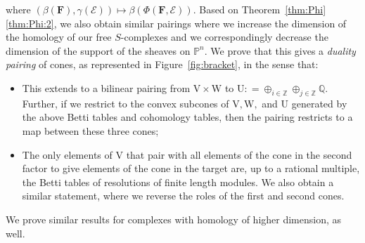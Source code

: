 \documentclass[12pt]{amsart}
\theoremstyle{definition}
\theoremstyle{remark}
\newcommand{\ZZ}{\mathbb{Z}}
\newcommand{\QQ}{\mathbb{Q}}
\newcommand{\UU}{\mathrm{U}}
\newcommand{\VV}{\mathrm{V}}
\newcommand{\WW}{\mathrm{W}}
\newcommand{\cE}{\mathcal{E}}
\newcommand{\FF}{\mathbf{F}}
\begin{document}
where $(\beta(\FF),\gamma(\cE))\mapsto \beta(\Phi(\FF,\cE))$.  Based on Theorem~\ref{thm:Phi}\eqref{thm:Phi:2}, we also obtain similar pairings where we increase the dimension of the homology of our free $S$-complexes and we correspondingly decrease the dimension of the support of the sheaves on $\mathbb P^n$.  We prove that this  gives a  \emph{duality pairing} of cones, as represented in Figure~\ref{fig:bracket},
in the sense that:
\begin{itemize}
\item This extends to a bilinear pairing from $\VV\times \WW$ to $\UU: = \oplus_{i\in \ZZ} \oplus_{j\in \ZZ}\QQ$.  Further, if we restrict to the convex subcones of $\VV, \WW,$ and $\UU$ generated by the above Betti tables and cohomology tables, then the pairing restricts to a map between these three cones;
\item The only elements of $\VV$ that pair with all elements of the cone in the second factor
 to give elements of the cone in the target are, up to a rational multiple, the Betti tables of  resolutions of finite length modules.  We also obtain a similar statement, where we reverse the roles of 
 the first and second cones.
\end{itemize}
 We prove similar results for complexes with homology of higher dimension, as well. 
\end{document}

